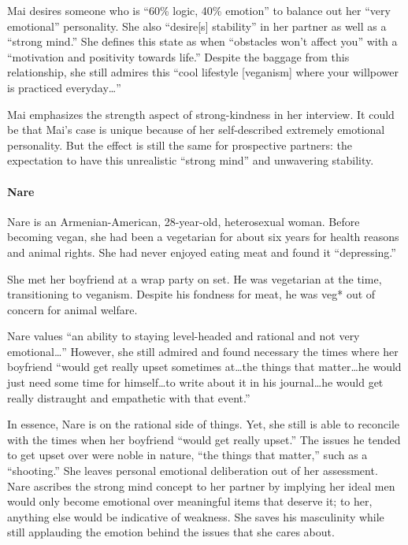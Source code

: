 Mai desires someone who is ``60\% logic, 40\% emotion'' to balance out her ``very emotional'' personality. She also ``desire{[}s{]} stability'' in her partner as well as a ``strong mind.'' She defines this state as when ``obstacles won't affect you'' with a ``motivation and positivity towards life.'' Despite the baggage from this relationship, she still admires this ``cool lifestyle {[}veganism{]} where your willpower is practiced everyday\ldots''

Mai emphasizes the strength aspect of strong-kindness in her interview. It could be that Mai's case is unique because of her self-described extremely emotional personality. But the effect is still the same for prospective partners: the expectation to have this unrealistic ``strong mind'' and unwavering stability.

\paragraph{Nare}

Nare is an Armenian-American, 28-year-old, heterosexual woman. Before becoming vegan, she had been a vegetarian for about six years for health reasons and animal rights. She had never enjoyed eating meat and found it ``depressing.''

She met her boyfriend at a wrap party on set. He was vegetarian at the time, transitioning to veganism. Despite his fondness for meat, he was veg* out of concern for animal welfare.

Nare values ``an ability to staying level-headed and rational and not very emotional\ldots'' However, she still admired and found necessary the times where her boyfriend ``would get really upset sometimes at\dots the things that matter\dots he would just need some time for himself\dots to write about it in his journal\dots he would get really distraught and empathetic with that event.''

In essence, Nare is on the rational side of things. Yet, she still is able to reconcile with the times when her boyfriend ``would get really upset.'' The issues he tended to get upset over were noble in nature, ``the things that matter,'' such as a ``shooting.'' She leaves personal emotional deliberation out of her assessment. Nare ascribes the strong mind concept to her partner by implying her ideal men would only become emotional over meaningful items that deserve it; to her, anything else would be indicative of weakness. She saves his masculinity while still applauding the emotion behind the issues that she cares about.

